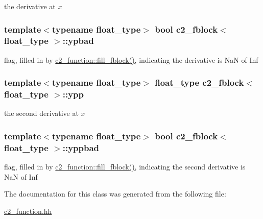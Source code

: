 the derivative at {\itshape x} 

\subsubsection[{\texorpdfstring{ypbad}{ypbad}}]{\setlength{\rightskip}{0pt plus 5cm}template$<$typename float\+\_\+type$>$ bool {\bf c2\+\_\+fblock}$<$ float\+\_\+type $>$\+::ypbad}\hypertarget{classc2__fblock_aa75a5d9ec9549d6fa22f6959a101de64}{}\label{classc2__fblock_aa75a5d9ec9549d6fa22f6959a101de64}


flag, filled in by \hyperlink{classc2__function_abdce52d0b89ff5bde13d9390ff8c2ba4}{c2\+\_\+function\+::fill\+\_\+fblock()}, indicating the derivative is NaN of Inf 

\subsubsection[{\texorpdfstring{ypp}{ypp}}]{\setlength{\rightskip}{0pt plus 5cm}template$<$typename float\+\_\+type$>$ float\+\_\+type {\bf c2\+\_\+fblock}$<$ float\+\_\+type $>$\+::ypp}\hypertarget{classc2__fblock_aad33c0adbb2d83549139ab8e9f69c0d3}{}\label{classc2__fblock_aad33c0adbb2d83549139ab8e9f69c0d3}


the second derivative at {\itshape x} 

\subsubsection[{\texorpdfstring{yppbad}{yppbad}}]{\setlength{\rightskip}{0pt plus 5cm}template$<$typename float\+\_\+type$>$ bool {\bf c2\+\_\+fblock}$<$ float\+\_\+type $>$\+::yppbad}\hypertarget{classc2__fblock_ad07bac2622d2bcfeb7e7892a7db536d3}{}\label{classc2__fblock_ad07bac2622d2bcfeb7e7892a7db536d3}


flag, filled in by \hyperlink{classc2__function_abdce52d0b89ff5bde13d9390ff8c2ba4}{c2\+\_\+function\+::fill\+\_\+fblock()}, indicating the second derivative is NaN of Inf 



The documentation for this class was generated from the following file\+:\begin{DoxyCompactItemize}
\item 
\hyperlink{c2__function_8hh}{c2\+\_\+function.\+hh}\end{DoxyCompactItemize}
